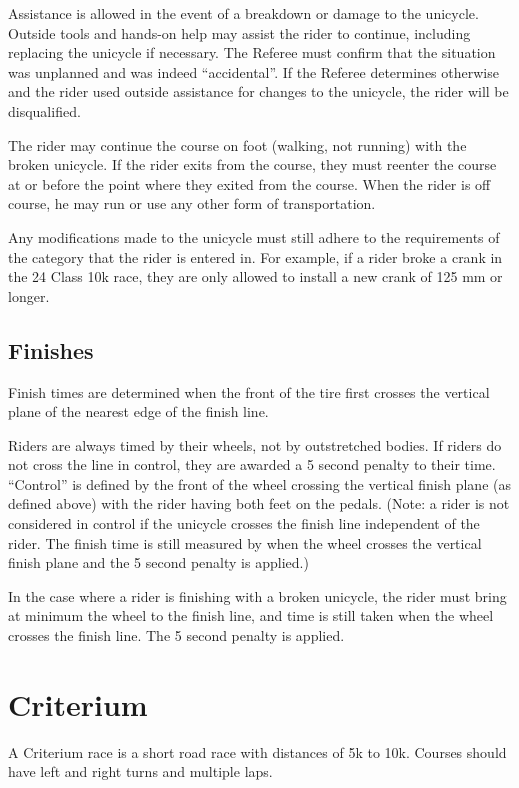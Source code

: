 Assistance is allowed in the event of a breakdown or damage to the unicycle.
Outside tools and hands-on help may assist the rider to continue, including replacing the unicycle if necessary.
The Referee must confirm that the situation was unplanned and was indeed ``accidental''.
If the Referee determines otherwise and the rider used outside assistance for changes to the unicycle, the rider will be disqualified.

The rider may continue the course on foot (walking, not running) with the broken unicycle.
If the rider exits from the course, they must reenter the course at or before the point where they exited from the course.
When the rider is off course, he may run or use any other form of transportation.

Any modifications made to the unicycle must still adhere to the requirements of the category that the rider is entered in.
For example, if a rider broke a crank in the 24 Class 10k race, they are only allowed to install a new crank of 125 mm or longer.


\subsection{Finishes}

Finish times are determined when the front of the tire first crosses the vertical plane of the nearest edge of the finish line.

Riders are always timed by their wheels, not by outstretched bodies.
If riders do not cross the line in control, they are awarded a 5 second penalty to their time.
``Control'' is defined by the front of the wheel crossing the vertical finish plane (as defined above) with the rider having both feet on the pedals.
(Note: a rider is not considered in control if the unicycle crosses the finish line independent of the rider.
The finish time is still measured by when the wheel crosses the vertical finish plane and the 5 second penalty is applied.)

In the case where a rider is finishing with a broken unicycle, the rider must bring at minimum the wheel to the finish line, and time is still taken when the wheel crosses the finish line.
The 5 second penalty is applied.

\section{Criterium}
A Criterium race is a short road race with distances of 5k to 10k.
Courses should have left and right turns and multiple laps.
